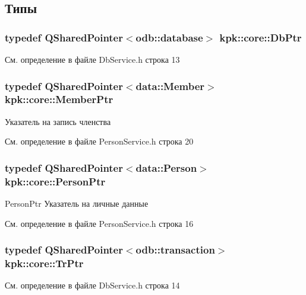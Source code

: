 \subsection{Типы}
\subsubsection[{\texorpdfstring{Db\+Ptr}{DbPtr}}]{\setlength{\rightskip}{0pt plus 5cm}typedef Q\+Shared\+Pointer$<$odb\+::database$>$ {\bf kpk\+::core\+::\+Db\+Ptr}}\hypertarget{namespacekpk_1_1core_a57462cfcc109ed2afcc118d0668710cf}{}\label{namespacekpk_1_1core_a57462cfcc109ed2afcc118d0668710cf}


См. определение в файле Db\+Service.\+h строка 13

\subsubsection[{\texorpdfstring{Member\+Ptr}{MemberPtr}}]{\setlength{\rightskip}{0pt plus 5cm}typedef Q\+Shared\+Pointer$<${\bf data\+::\+Member}$>$ {\bf kpk\+::core\+::\+Member\+Ptr}}\hypertarget{namespacekpk_1_1core_aca962f7fa9cb72f79643863d3634f7b9}{}\label{namespacekpk_1_1core_aca962f7fa9cb72f79643863d3634f7b9}


Указатель на запись членства 



См. определение в файле Person\+Service.\+h строка 20

\subsubsection[{\texorpdfstring{Person\+Ptr}{PersonPtr}}]{\setlength{\rightskip}{0pt plus 5cm}typedef Q\+Shared\+Pointer$<${\bf data\+::\+Person}$>$ {\bf kpk\+::core\+::\+Person\+Ptr}}\hypertarget{namespacekpk_1_1core_a4a1c110098ffdfb42bdcba45c4d9a7fe}{}\label{namespacekpk_1_1core_a4a1c110098ffdfb42bdcba45c4d9a7fe}


Person\+Ptr Указатель на личные данные 



См. определение в файле Person\+Service.\+h строка 16

\subsubsection[{\texorpdfstring{Tr\+Ptr}{TrPtr}}]{\setlength{\rightskip}{0pt plus 5cm}typedef Q\+Shared\+Pointer$<$odb\+::transaction$>$ {\bf kpk\+::core\+::\+Tr\+Ptr}}\hypertarget{namespacekpk_1_1core_a3bd2bbeaff3894d4ee696d6fae548f3f}{}\label{namespacekpk_1_1core_a3bd2bbeaff3894d4ee696d6fae548f3f}


См. определение в файле Db\+Service.\+h строка 14


